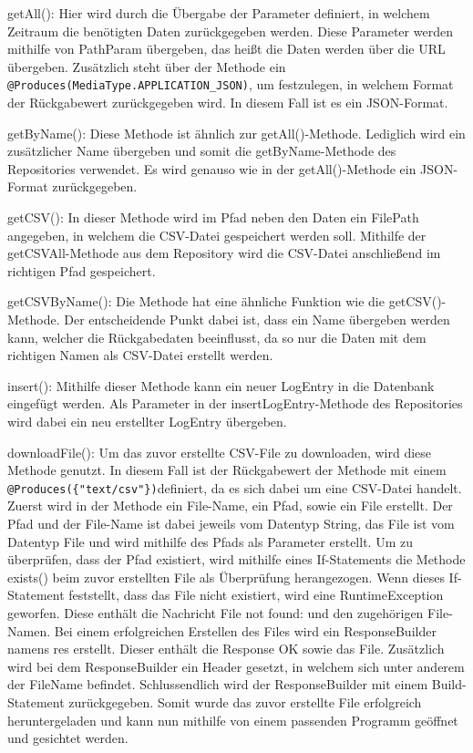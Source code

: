 \begin{compactitem}
    \item getAll(): Hier wird durch die Übergabe der Parameter definiert, in welchem Zeitraum die benötigten Daten zurückgegeben werden. Diese Parameter werden mithilfe von PathParam übergeben, das heißt die Daten werden über die URL übergeben. Zusätzlich steht über der Methode ein \texttt{@Produces(MediaType.APPLICATION\_JSON)}, um festzulegen, in welchem Format der Rückgabewert zurückgegeben wird. In diesem Fall ist es ein JSON-Format.
    \item getByName(): Diese Methode ist ähnlich zur getAll()-Methode. Lediglich wird ein zusätzlicher Name übergeben und somit die getByName-Methode des Repositories verwendet. Es wird genauso wie in der getAll()-Methode ein JSON-Format zurückgegeben.
    \item getCSV(): In dieser Methode wird im Pfad neben den Daten ein FilePath angegeben, in welchem die CSV-Datei gespeichert werden soll. Mithilfe der getCSVAll-Methode aus dem Repository wird die CSV-Datei anschließend im richtigen Pfad gespeichert.
    \item getCSVByName(): Die Methode hat eine ähnliche Funktion wie die getCSV()-Methode. Der entscheidende Punkt dabei ist, dass ein Name übergeben werden kann, welcher die Rückgabedaten beeinflusst, da so nur die Daten mit dem richtigen Namen als CSV-Datei erstellt werden. 
    \item insert(): Mithilfe dieser Methode kann ein neuer LogEntry in die Datenbank eingefügt werden. Als Parameter in der insertLogEntry-Methode des Repositories wird dabei ein neu erstellter LogEntry übergeben.
    \item downloadFile(): Um das zuvor erstellte CSV-File zu downloaden, wird diese Methode genutzt. In diesem Fall ist der Rückgabewert der Methode mit einem \\ \texttt{@Produces(\{"text/csv"\})}definiert, da es sich dabei um eine CSV-Datei handelt. Zuerst wird in der Methode ein File-Name, ein Pfad, sowie ein File erstellt. Der Pfad und der File-Name ist dabei jeweils vom Datentyp String, das File ist vom Datentyp File und wird mithilfe des Pfads als Parameter erstellt. Um zu überprüfen, dass der Pfad existiert, wird mithilfe eines If-Statements die Methode exists() beim zuvor erstellten File als Überprüfung herangezogen. Wenn dieses If-Statement feststellt, dass das File nicht existiert, wird eine RuntimeException geworfen. Diese enthält die Nachricht \glqq File not found: \grqq{} und den zugehörigen File-Namen. Bei einem erfolgreichen Erstellen des Files wird ein ResponseBuilder namens res erstellt. Dieser enthält die Response OK sowie das File. Zusätzlich wird bei dem ResponseBuilder ein Header gesetzt, in welchem sich unter anderem der FileName befindet. Schlussendlich wird der ResponseBuilder mit einem Build-Statement zurückgegeben. Somit wurde das zuvor erstellte File erfolgreich heruntergeladen und kann nun mithilfe von einem passenden Programm geöffnet und gesichtet werden.
\end{compactitem}
 

